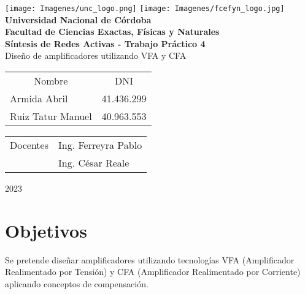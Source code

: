 \documentclass[12pt,A4paper,titlepage]{article}
\begin{document}
\begin{titlepage}

\thispagestyle{empty}



\begin{center}
    \texttt{[image: Imagenes/unc\_logo.png]}
    \texttt{[image: Imagenes/fcefyn\_logo.jpg]}
    \\[1cm]
    \vspace{5pt}
    \LARGE \textbf{Universidad Nacional de Córdoba}\\[0.5cm] 
    \large \textbf{Facultad de Ciencias Exactas, Físicas y Naturales} \\[0.5cm] 
    \large \textbf{Síntesis de Redes Activas - Trabajo Práctico 4}
    \\[0.5cm]
    \large Diseño de amplificadores utilizando VFA y CFA
    \\[0.2cm] 
    \vspace{60pt}
    \begin{table}[!h]
    \centering
    \begin{tabular}{ll}
    \multicolumn{1}{c}{Nombre} & \multicolumn{1}{c}{DNI} \\
    Armida Abril & 41.436.299 \\
    Ruiz Tatur Manuel & 40.963.553
    \end{tabular}
    \end{table}
    \vspace{20pt}
    \begin{table}[!h]
    \centering
    \begin{tabular}{ll}
    \multicolumn{1}{c}{Docentes} & Ing. Ferreyra Pablo \\ & Ing. César Reale \\
    \end{tabular}
    \end{table}
    \vspace{20pt}
    \large 2023
\end{center}

\end{titlepage}

\newpage
\tableofcontents %

\newpage

\section{Objetivos}
\hspace{1mm} Se pretende diseñar amplificadores utilizando tecnologías VFA (Amplificador Realimentado por Tensión) y CFA (Amplificador Realimentado por Corriente) aplicando conceptos de compensación.
\end{document}
